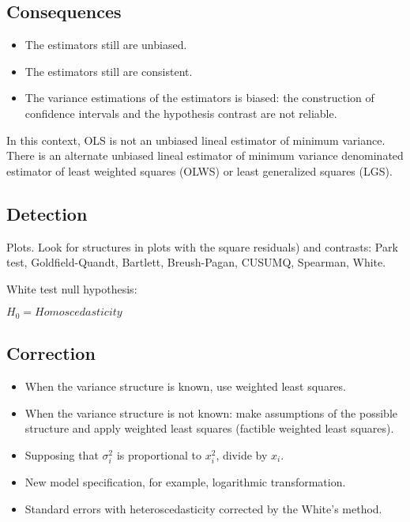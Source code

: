 \documentclass[10pt, a4paper, landscape]{extarticle}
\begin{document}
\begin{multicols}{3}
\subsection*{Consequences}

\begin{itemize}[leftmargin=*]
\item The estimators still are unbiased.
\item The estimators still are consistent.
\item The variance estimations of the estimators is biased: the construction of confidence intervals and the hypothesis contrast are not reliable.
\end{itemize}

In this context, OLS is not an unbiased lineal estimator of minimum variance. There is an alternate unbiased lineal estimator of minimum variance denominated estimator of least weighted squares (OLWS) or least generalized squares (LGS).

\subsection*{Detection}

Plots. Look for structures in plots with the square residuals) and contrasts: Park test, Goldfield-Quandt, Bartlett, Breush-Pagan, CUSUMQ, Spearman, White.

White test null hypothesis:

$H_0 = Homoscedasticity$

\subsection*{Correction}

\begin{itemize}[leftmargin=*]
\item When the variance structure is known, use weighted least squares.
\item When the variance structure is not known: make assumptions of the possible structure and apply weighted least squares (factible weighted least squares).
\item Supposing that $\sigma_i^2$ is proportional to $x_i^2$, divide by $x_i$.
\item New model specification, for example, logarithmic transformation.
\item Standard errors with heteroscedasticity corrected by the White's method.
\end{itemize}


\end{multicols}
\end{document}
